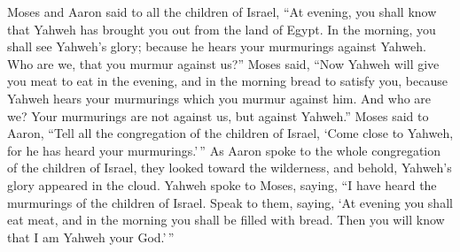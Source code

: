  Moses and Aaron said to all the children of Israel, ``At
evening, you shall know that Yahweh has brought you out from the land of
Egypt.  In the morning, you shall see Yahweh's glory;
because he hears your murmurings against Yahweh. Who are we, that you
murmur against us?''  Moses said, ``Now Yahweh will give you
meat to eat in the evening, and in the morning bread to satisfy you,
because Yahweh hears your murmurings which you murmur against him. And
who are we? Your murmurings are not against us, but against Yahweh.''
 Moses said to Aaron, ``Tell all the congregation of the
children of Israel, `Come close to Yahweh, for he has heard your
murmurings.'\,''  As Aaron spoke to the whole congregation
of the children of Israel, they looked toward the wilderness, and
behold, Yahweh's glory appeared in the cloud.  Yahweh spoke
to Moses, saying,  ``I have heard the murmurings of the
children of Israel. Speak to them, saying, `At evening you shall eat
meat, and in the morning you shall be filled with bread. Then you will
know that I am Yahweh your God.'\,''

